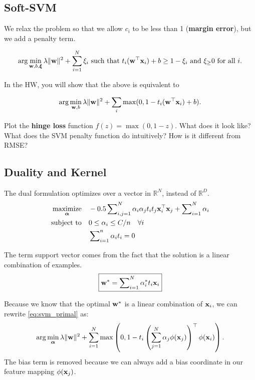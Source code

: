 \documentclass{discussion}
\begin{document}
\subsection{Soft-SVM}

We relax the problem so that we allow $c_i$ to be less than 1 (\textbf{margin error}), but we add a penalty term.

\begin{equation}
    \arg\min_{\mathbf{w}, b, \boldsymbol{\xi}} \lambda\|\mathbf{w}\|^2 + \sum_{i=1}^{N} \xi_i \ \text{such that $t_{i} (\mathbf{w}^\top \mathbf{x}_{i}) + b \geq 1 - \xi_i$ and $\xi_ \geq 0$ for all $i$.}
\end{equation}

In the HW, you will show that the above is equivalent to 

\newcommand{\Lhinge}{L_{\text{hinge}}}
\begin{equation}
\label{eq:svm_primal}
    \arg\min_{\mathbf{w}, b} \lambda\|\mathbf{w}\|^2 + \sum_i \max(0,1 - t_{i} (\mathbf{w}^\top \mathbf{x}_{i}) + b).
\end{equation}
\begin{exercise}
  Plot the \textbf{hinge loss} function $f(z) = \max(0, 1 - z)$. What does it look like? What does the SVM penalty function do intuitively? How is it different from RMSE?
\end{exercise}


\subsection{Duality and Kernel}

The dual formulation optimizes over a vector in $\mathbb{R}^N$, instead of $\mathbb{R}^D$.
    \begin{align*}
    \underset{\boldsymbol{\alpha}}{\text{maximize}} \quad &  -0.5 \sum \nolimits_{i,j = 1}^N \alpha_i \alpha_j t_i t_j \mathbf{x}_i^\top \mathbf{x}_j + \sum \nolimits_{i = 1}^N \alpha_i\\
    \text{subject to} \quad & 0 \leq \alpha_i \leq C/n \quad \forall i\ \\
    \quad & \sum \nolimits_{i=1}^n \alpha_i t_i = 0    
    \end{align*} 

The term support vector comes from the fact that the solution is a linear combination of examples.
\[\boxed{ \mathbf{w}^* = \sum \nolimits_{i=1}^N \alpha_i^* t_i \mathbf{x}_i }\]

Because we know that the optimal $\mathbf{w}^*$ is a linear combination of $\mathbf{x}_i$, we can rewrite \eqref{eq:svm_primal} as:
\begin{equation}
    \arg\min_{\boldsymbol{\alpha}} \lambda\|\mathbf{w}\|^2 + \sum_{i=1}^{N} \max\left(0, 1 - t_i \left(\sum_{j=1}^{N} \alpha_j \phi(\mathbf{x}_j)\right)^\top \phi(\mathbf{x}_i)\right).
\end{equation}
The bias term is removed because we can always add a bias coordinate in our feature mapping $\phi(\mathbf{x}_j)$.
\end{document}
